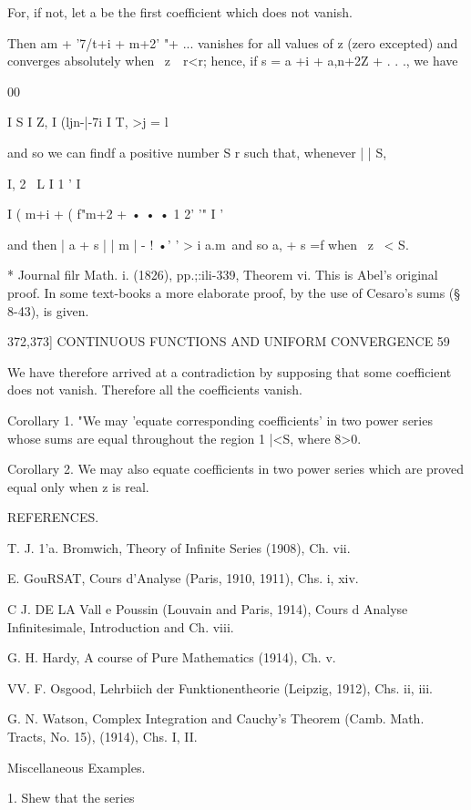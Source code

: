 For, if not, let a be the first coefficient which does not vanish.

Then am + '7/t+i + m+2' "+ ... vanishes for all values of z (zero
excepted) and converges absolutely when \ z\ \ r<r; hence, if s = a
+i + a,n+2Z + . . ., we have

00

I S I Z, I (ljn-|-7i I T, >j = l

and so we can findf a positive number S r such that, whenever | | S,

I, 2 \ L I 1 ' I

I ( m+i + ( f"m+2 + • • • 1 2' '" I '

and then | a + s | | m | - ! •' ' > i a.m\, and so a, + s =f when \ z
\ < S.

* Journal filr Math. i. (1826), pp.;:ili-339, Theorem vi. This is
Abel's original proof. In some text-books a more elaborate proof, by
the use of Cesaro's sums (§ 8-43), is given.



372,373] CONTINUOUS FUNCTIONS AND UNIFORM CONVERGENCE 59

We have therefore arrived at a contradiction by supposing that some
coefficient does not vanish. Therefore all the coefficients vanish.

Corollary 1. "We may 'equate corresponding coefficients' in two power
series whose sums are equal throughout the region 1 |<S, where 8>0.

Corollary 2. We may also equate coefficients in two power series which
are proved equal only when z is real.



REFERENCES.

T. J. 1'a. Bromwich, Theory of Infinite Series (1908), Ch. vii.

E. GouRSAT, Cours d'Analyse (Paris, 1910, 1911), Chs. i, xiv.

C J. DE LA Vall e Poussin (Louvain and Paris, 1914), Cours d Analyse
Infinitesimale, Introduction and Ch. viii.

G. H. Hardy, A course of Pure Mathematics (1914), Ch. v.

VV. F. Osgood, Lehrbiich der Funktionentheorie (Leipzig, 1912), Chs.
ii, iii.

G. N. Watson, Complex Integration and Cauchy's Theorem (Camb. Math.
Tracts, No. 15), (1914), Chs. I, II.



Miscellaneous Examples.

1. Shew that the series



